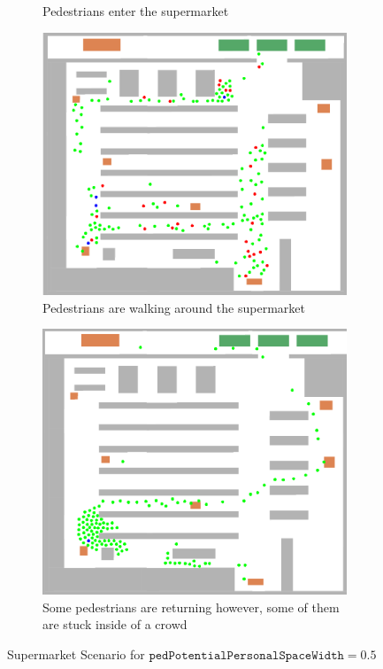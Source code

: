 \begin{figure}[H]
\begin{subfigure}[b]{0.49\textwidth}
        \caption{Pedestrians enter the supermarket}
        \label{fig:supermarket_b}
    \end{subfigure}

    \begin{subfigure}[b]{0.49\textwidth}
        \centering
        \includegraphics[width=\textwidth]{images/task5_shoppingmid.png}
        \caption{ Pedestrians are walking around the supermarket}
        \label{fig:supermarket_c}
    \end{subfigure}
    \hfill
    \begin{subfigure}[b]{0.49\textwidth}
        \centering
        \includegraphics[width=\textwidth]{images/task5_shoppingend.png}
        \caption{Some pedestrians are returning however, some of them are stuck inside of a crowd}
        \label{fig:supermarket_d}
    \end{subfigure}
\caption{Supermarket Scenario for $\texttt{pedPotentialPersonalSpaceWidth} = 0.5$ }
    
\end{figure}

